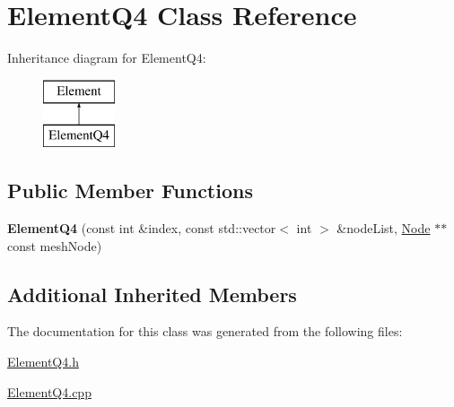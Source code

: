 \hypertarget{class_element_q4}{}\section{Element\+Q4 Class Reference}
\label{class_element_q4}
Inheritance diagram for Element\+Q4\+:\begin{figure}[H]
\begin{center}
\leavevmode
\includegraphics[height=2.000000cm]{class_element_q4}
\end{center}
\end{figure}
\subsection*{Public Member Functions}
\begin{DoxyCompactItemize}
\item 
\mbox{\label{class_element_q4_ab119a15023a7abb356d5db5961e2febb}} 
{\bfseries Element\+Q4} (const int \&index, const std\+::vector$<$ int $>$ \&node\+List, \mbox{\hyperlink{class_node}{Node}} $\ast$$\ast$const mesh\+Node)
\end{DoxyCompactItemize}
\subsection*{Additional Inherited Members}


The documentation for this class was generated from the following files\+:\begin{DoxyCompactItemize}
\item 
\mbox{\hyperlink{_element_q4_8h}{Element\+Q4.\+h}}\item 
\mbox{\hyperlink{_element_q4_8cpp}{Element\+Q4.\+cpp}}\end{DoxyCompactItemize}
